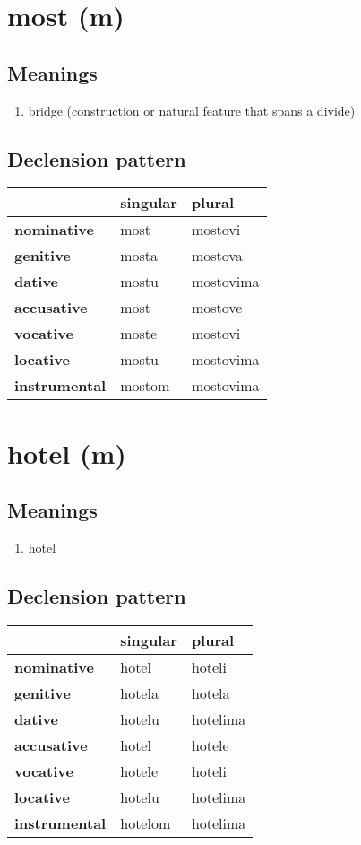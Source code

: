 \filbreak
\section{most (m)}
\subsection*{Meanings}
\begin{enumerate}
\item bridge (construction or natural feature that spans a divide)
\end{enumerate}
\subsection*{Declension pattern}
\begin{tabularx}{\linewidth}{Xll}
\toprule
{} & singular &     plural \\
\midrule
\textbf{nominative  } &     most &    mostovi \\
\textbf{genitive    } &    mosta &    mostova \\
\textbf{dative      } &    mostu &  mostovima \\
\textbf{accusative  } &     most &    mostove \\
\textbf{vocative    } &    moste &    mostovi \\
\textbf{locative    } &    mostu &  mostovima \\
\textbf{instrumental} &   mostom &  mostovima \\
\bottomrule
\end{tabularx}

\filbreak
\section{hotel (m)}
\subsection*{Meanings}
\begin{enumerate}
\item hotel
\end{enumerate}
\subsection*{Declension pattern}
\begin{tabularx}{\linewidth}{Xll}
\toprule
{} & singular &    plural \\
\midrule
\textbf{nominative  } &    hotel &    hoteli \\
\textbf{genitive    } &   hotela &    hotela \\
\textbf{dative      } &   hotelu &  hotelima \\
\textbf{accusative  } &    hotel &    hotele \\
\textbf{vocative    } &   hotele &    hoteli \\
\textbf{locative    } &   hotelu &  hotelima \\
\textbf{instrumental} &  hotelom &  hotelima \\
\bottomrule
\end{tabularx}

